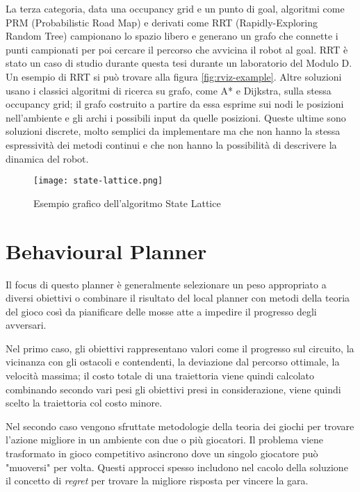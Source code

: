 La terza categoria, data una occupancy grid e un punto di goal, algoritmi come PRM (Probabilistic Road
Map) e derivati come RRT (Rapidly-Exploring Random Tree) campionano lo spazio libero e generano un grafo
che connette i punti campionati per poi cercare il percorso che avvicina il robot al goal. RRT è stato un
caso di studio durante questa tesi durante un laboratorio del Modulo D. Un esempio di RRT si può trovare
alla figura \ref{fig:rviz-example}. Altre soluzioni usano i classici algoritmi di ricerca su grafo, come
A* e Dijkstra, sulla stessa occupancy grid; il grafo costruito a partire da essa esprime sui nodi le posizioni
nell'ambiente e gli archi i possibili input da quelle posizioni. Queste ultime sono soluzioni discrete,
molto semplici da implementare ma che non hanno la stessa espressività dei metodi continui e che non
hanno la possibilità di descrivere la dinamica del robot.

\begin{figure}[h]
	\begin{center}
		\texttt{[image: state-lattice.png]}
	\end{center}
	\caption{Esempio grafico dell'algoritmo State Lattice \cite{lection11}}
	\label{fig:state-lattice}
\end{figure}

\section{Behavioural Planner}
Il focus di questo planner è generalmente selezionare un peso appropriato a diversi obiettivi o combinare
il risultato del local planner con metodi della teoria del gioco così da pianificare delle mosse atte a
impedire il progresso degli avversari.

Nel primo caso, gli obiettivi rappresentano valori come il progresso sul circuito, la vicinanza con gli
ostacoli e contendenti, la deviazione dal percorso ottimale, la velocità massima; il costo totale di una
traiettoria viene quindi calcolato combinando secondo vari pesi gli obiettivi presi in considerazione,
viene quindi scelto la traiettoria col costo minore.

Nel secondo caso vengono sfruttate metodologie della teoria dei giochi per trovare l'azione migliore in
un ambiente con due o più giocatori. Il problema viene trasformato in gioco competitivo asincrono dove un
singolo giocatore può "muoversi" per volta. Questi approcci spesso includono nel cacolo della soluzione il
concetto di \textit{regret} per trovare la migliore risposta per vincere la gara.

